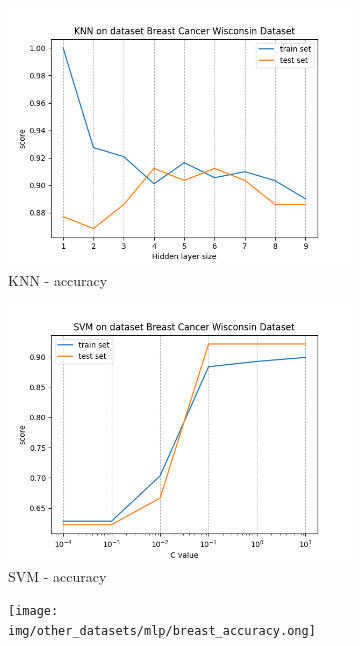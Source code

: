 \documentclass[12pt]{article}
\newcommand*{\subfigwidth}{0.24\textwidth}
\begin{document}
\begin{figure}[H]\centering
    \begin{subfigure}[t]{\subfigwidth}
        \includegraphics[width=\linewidth]{img/other_datasets/knn/breast_accuracy.png}
        \caption{KNN - accuracy}
    \end{subfigure}
    \hfill
    \begin{subfigure}[t]{\subfigwidth}
        \includegraphics[width=\linewidth]{img/other_datasets/svm/breast_accuracy.png}
        \caption{SVM - accuracy}
    \end{subfigure}
    \hfill
    \begin{subfigure}[t]{\subfigwidth}
        \texttt{[image: img/other\_datasets/mlp/breast\_accuracy.ong]}

\end{subfigure}
\end{figure}
\end{document}
